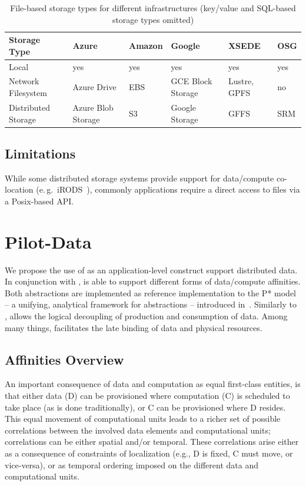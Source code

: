 \documentclass[conference]{IEEEtran}
\begin{document}
\begin{table}[t]
\begin{tabular}{|p{1.3cm}|p{1cm}|p{1cm}|p{1cm}|p{1cm}|p{1cm}|}
	\hline
	\textbf{Storage Type} &\textbf{Azure} &\textbf{Amazon} &\textbf{Google} &\textbf{XSEDE}  &\textbf{OSG} \\
	\hline
	Local	&yes &yes &yes &yes &yes\\
	\hline
	Network Filesystem &Azure Drive &EBS &GCE Block Storage &Lustre, GPFS 
	&no\\
	\hline
	Distributed Storage &Azure Blob Storage &S3 &Google Storage &GFFS
	 &SRM\\
	\hline	
\end{tabular}
\caption{File-based storage types for different infrastructures (key/value and 
SQL-based storage types omitted) \label{tab:storage-systems}}
\end{table}


\subsection{Limitations}
While some distributed storage systems provide support for data/compute 
co-location (e.\,g.\ iRODS~\cite{Rajasekar:2010:IPI:1855046}), commonly 
applications require a direct access to files via a Posix-based API.


\section{Pilot-Data}

We propose the use of \pilotdata as an application-level construct support
distributed data. In conjunction with \pilotjob, \pilotdata is able to support
different forms of data/compute affinities. Both abstractions are implemented
as reference implementation to the P* model -- a unifying, analytical
framework for \pilot abstractions -- introduced in~\cite{pstar11}. 
Similarly to \pilotjobs, \pilotdata allows the logical decoupling
of production and consumption of data. Among many things, \pilotdata 
facilitates the late binding of data and physical resources.  

\subsection{Affinities Overview}

An important consequence of data and computation as equal first-class
entities, is that either data (D) can be provisioned where computation
(C) is scheduled to take place (as is done traditionally), or C can be
provisioned where D resides. This equal movement of computational
units leads to a richer set of possible correlations between the
involved data elements and computational units; correlations can be
either spatial and/or temporal. These correlations arise either as a
consequence of constraints of localization (e.g., D is fixed, C must
move, or vice-versa), or as temporal ordering imposed on the different
data and computational units.
\end{document}
